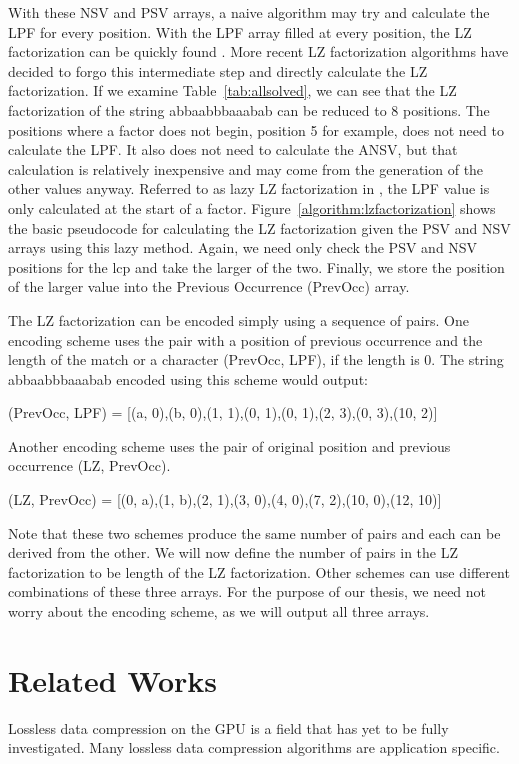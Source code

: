 With these NSV and PSV arrays, a naive algorithm may try and calculate the LPF for every position.
With the LPF array filled at every position, the LZ factorization can be quickly found \cite{crochemore2008computing}.
More recent LZ factorization algorithms have decided to forgo this intermediate step and directly calculate the LZ factorization.
If we examine Table~\ref{tab:allsolved}, we can see that the LZ factorization of the string abbaabbbaaabab can be reduced to 8 positions.
The positions where a factor does not begin, position 5 for example, does not need to calculate the LPF.
It also does not need to calculate the ANSV, but that calculation is relatively inexpensive and may come from the generation of the other values anyway.
Referred to as lazy LZ factorization in \cite{karkkainen2013linear}, the LPF value is only calculated at the start of a factor.
Figure~\ref{algorithm:lzfactorization} shows the basic pseudocode for calculating the LZ factorization given the PSV and NSV arrays using this lazy method.
Again, we need only check the PSV and NSV positions for the lcp and take the larger of the two.
Finally, we store the position of the larger value into the Previous Occurrence (PrevOcc) array.

The LZ factorization can be encoded simply using a sequence of pairs.
One encoding scheme uses the pair with a position of previous occurrence and the length of the match or a character (PrevOcc, LPF), if the length is 0.
The string abbaabbbaaabab encoded using this scheme would output:\\
\centerline{(PrevOcc, LPF) = [(a, 0),(b, 0),(1, 1),(0, 1),(0, 1),(2, 3),(0, 3),(10, 2)]}
Another encoding scheme uses the pair of original position and previous occurrence (LZ, PrevOcc).\\
\centerline{(LZ, PrevOcc) = [(0, a),(1, b),(2, 1),(3, 0),(4, 0),(7, 2),(10, 0),(12, 10)]}
Note that these two schemes produce the same number of pairs and each can be derived from the other.
We will now define the number of pairs in the LZ factorization to be length of the LZ factorization.
Other schemes can use different combinations of these three arrays.
For the purpose of our thesis, we need not worry about the encoding scheme, as we will output all three arrays.

\section{Related Works}

Lossless data compression on the GPU is a field that has yet to be fully investigated.
Many lossless data compression algorithms are application specific.

